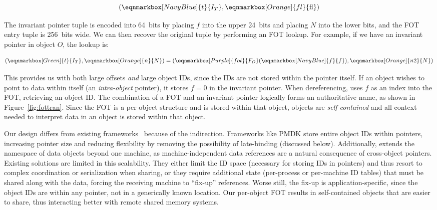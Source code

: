 \begin{equation*}
    \left(
    \eqnmarkbox[NavyBlue]{t}{I_T},
    \eqnmarkbox[Orange]{fl}{\mathrm{fl}}
    \right)
\end{equation*}

The invariant pointer tuple is encoded into 64~bits by placing $f$ into the upper 24~bits and placing $N$ into the lower
bits, and the FOT entry tuple is 256~bits wide.
We can then recover the original tuple by performing an FOT lookup. For example, if we have an invariant pointer in
object $O$, the lookup is:

\begin{equation}\label{eq:fot}
    \left(
    \eqnmarkbox[Green]{t}{I_T}
    , \eqnmarkbox[Orange]{n}{N}\right) = \left(
    \eqnmarkbox[Purple]{fot}{F_O}(\eqnmarkbox[NavyBlue]{f}{f})
    , \eqnmarkbox[Orange]{n2}{N}
    \right)
\end{equation}
\vspace{0.4em}

This provides us
with both large offsets \emph{and} large object IDs, since the IDs are not stored within the pointer
itself.
If an object wishes to point to data within itself (an \emph{intra-object} pointer), it stores $f = 0$ in
the invariant pointer. When dereferencing, \Twizzler uses $f$
as an index into the FOT, retrieving an object ID\@.
The combination of a FOT and an invariant pointer logically forms
an authoritative name, as shown in Figure~\ref{fig:fottran}. Since the FOT is a per-object structure and is stored
within that object, objects are \emph{self-contained} and all context needed to interpret data in an object is stored
within that object.

Our design differs from existing
frameworks~\cite{corbato_introduction_1965,bensoussan:sosp69,daley:cacm68,pmdk-pointers,libpmem,Chen:micro17}
because of the indirection. Frameworks like PMDK store entire object IDs within pointers,
increasing pointer size and reducing flexibility by removing
the possibility of late-binding (discussed below). Additionally, \Twizzler extends the
namespace of data objects beyond one machine, as machine-independent data references
are a natural consequence of cross-object pointers. Existing solutions are limited
in this scalability. They either limit the ID space (necessary for storing IDs
in pointers) and thus resort to complex coordination or serialization when sharing, or
they require additional state (\eg per-process or per-machine ID tables) that must
be shared along with the data, forcing the receiving machine to ``fix-up''
references. Worse still, the fix-up is application-specific, since the object IDs are
within any pointer, not in a generically known location.
Our per-object FOT results in self-contained objects that are easier to share, thus interacting better with remote shared memory systems.

